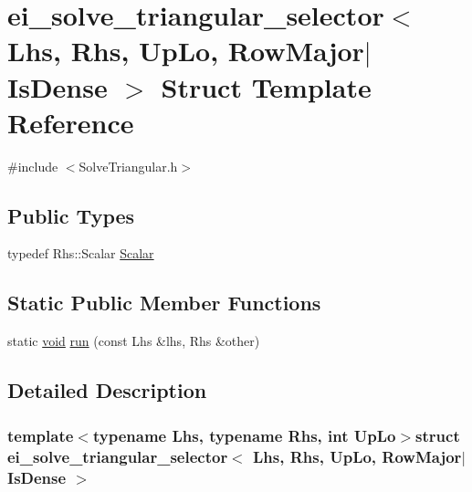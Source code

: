 \hypertarget{structei__solve__triangular__selector_3_01_lhs_00_01_rhs_00_01_up_lo_00_01_row_major_7_is_dense_01_4}{\section{ei\-\_\-solve\-\_\-triangular\-\_\-selector$<$ Lhs, Rhs, Up\-Lo, Row\-Major$|$\-Is\-Dense $>$ Struct Template Reference}
\label{structei__solve__triangular__selector_3_01_lhs_00_01_rhs_00_01_up_lo_00_01_row_major_7_is_dense_01_4}
}


{\ttfamily \#include $<$Solve\-Triangular.\-h$>$}

\subsection*{Public Types}
\begin{DoxyCompactItemize}
\item 
typedef Rhs\-::\-Scalar \hyperlink{structei__solve__triangular__selector_3_01_lhs_00_01_rhs_00_01_up_lo_00_01_row_major_7_is_dense_01_4_aaa098f44dc610979d1cd2d40355e5f52}{Scalar}
\end{DoxyCompactItemize}
\subsection*{Static Public Member Functions}
\begin{DoxyCompactItemize}
\item 
static \hyperlink{group___u_a_v_objects_plugin_ga444cf2ff3f0ecbe028adce838d373f5c}{void} \hyperlink{structei__solve__triangular__selector_3_01_lhs_00_01_rhs_00_01_up_lo_00_01_row_major_7_is_dense_01_4_a3d5a23bb2d1f1420cd2f212853262ae2}{run} (const Lhs \&lhs, Rhs \&other)
\end{DoxyCompactItemize}


\subsection{Detailed Description}
\subsubsection*{template$<$typename Lhs, typename Rhs, int Up\-Lo$>$struct ei\-\_\-solve\-\_\-triangular\-\_\-selector$<$ Lhs, Rhs, Up\-Lo, Row\-Major$|$\-Is\-Dense $>$}



